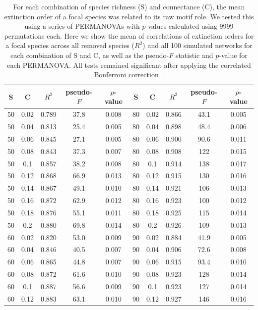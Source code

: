 \documentclass[12pt]{article}
\begin{document}
\begin{spacing}{2.0}
		\begin{table}[hb!]
			\caption{For each combination of species richness (S) and connectance (C), the mean extinction order of a focal species was related to its raw motif role. We tested this using a series of PERMANOVAs with $p$-values calculated using 9999 permutations each. Here we show the mean of correlations of extinction orders for a focal species across all removed species ($R^2$) and all 100 simulated networks for each combination of S and C, as well as the pseudo-$F$ statistic and $p$-value for each PERMANOVA. All tests remained significant after applying the correlated Bonferroni correction~\citep{Drezner2016}.}
			\label{permtable_count}
			\begin{tabular}{c c | c | c c ||c c | c | c c |}
				S	&	C	&	$R^2$	&	pseudo-$F$	&	$p$-value	&	S	&	C &	$R^2$	&	pseudo-$F$	&	$p$-value\\ 
				\hline
				50&0.02&0.789&37.8&0.008	&	80&0.02&0.866&43.1&0.005\\
                50&0.04&0.813&25.4&0.005	&	80&0.04&0.898&48.4&0.006\\
                50&0.06&0.845&27.1&0.005	&	80&0.06&0.900&90.6&0.011\\
                50&0.08&0.843&37.3&0.007	&	80&0.08&0.908&122&0.015\\
                50&0.1&0.857&38.2&0.008	&	80&0.1&0.914&138&0.017\\
                50&0.12&0.868&66.9&0.013	&	80&0.12&0.915&130&0.016\\
                50&0.14&0.867&49.1&0.010	&	80&0.14&0.921&106&0.013\\
                50&0.16&0.872&62.9&0.012	&	80&0.16&0.923&100&0.012\\
                50&0.18&0.876&55.1&0.011	&	80&0.18&0.925&115&0.014\\
                50&0.2&0.880&69.8&0.014	&	80&0.2&0.926&109&0.013\\
                60&0.02&0.820&53.0&0.009	&	90&0.02&0.884&41.9&0.005\\
                60&0.04&0.846&40.5&0.007	&	90&0.04&0.906&72.6&0.008\\
                60&0.06&0.865&44.8&0.007	&	90&0.06&0.915&93.4&0.010\\
                60&0.08&0.872&61.6&0.010	&	90&0.08&0.923&128&0.014\\
                60&0.1&0.887&56.6&0.009	&	90&0.1&0.923&127&0.014\\
                60&0.12&0.883&63.1&0.010	&	90&0.12&0.927&146&0.016\\

\end{tabular}
\end{table}
\end{spacing}
\end{document}
